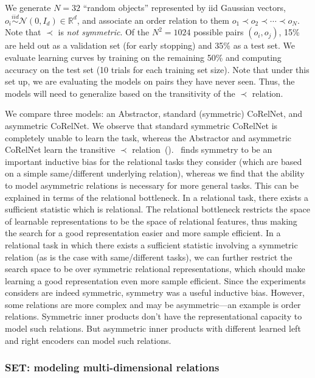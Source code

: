 We generate $N = 32$ ``random objects'' represented by iid Gaussian vectors, $o_i \overset{iid}{\sim} \mathcal{N}(0,
I_d) \in \mathbb{R}^d$, and associate an order relation to them $o_1 \prec o_2 \prec \cdots \prec o_N$. Note that $\prec$ is \textit{not symmetric}. Of the $N^2 = 1024$ possible pairs $(o_i, o_j)$, 15\% are held out as a validation set (for early stopping) and 35\% as a test set. We evaluate learning curves by training on the remaining 50\% and computing accuracy on the test set (10 trials for each training set size). Note that under this set up, we are evaluating the models on pairs they have never seen. Thus, the models will need to generalize based on the transitivity of the $\prec$ relation.

We compare three models: an Abstractor, standard (symmetric) CoRelNet, and asymmetric CoRelNet. We observe that standard symmetric CoRelNet is completely unable to learn the task, whereas the Abstractor and asymmetric CoRelNet learn the transitive $\prec$ relation~().~\citep{kerg2022neural} finds symmetry to be an important inductive bias for the relational tasks they consider (which are based on a simple same/different underlying relation), whereas we find that the ability to model asymmetric relations is necessary for more general tasks. This can be explained in terms of the relational bottleneck. In a relational task, there exists a sufficient statistic which is relational. The relational bottleneck restricts the space of learnable representations to be the space of relational features, thus making the search for a good representation easier and more sample efficient. In a relational task in which there exists a sufficient statistic involving a symmetric relation (as is the case with same/different tasks), we can further restrict the search space to be over symmetric relational representations, which should make learning a good representation even more sample efficient. Since the experiments \citep{kerg2022neural} considers are indeed symmetric, symmetry was a useful inductive bias. However, some relations are more complex and may be asymmetric---an example is order relations. Symmetric inner products don't have the representational capacity to model such relations. But asymmetric inner products with different learned left and right encoders can model such relations.

\subsubsection{SET: modeling multi-dimensional relations}\label{sssec:exp_set}


